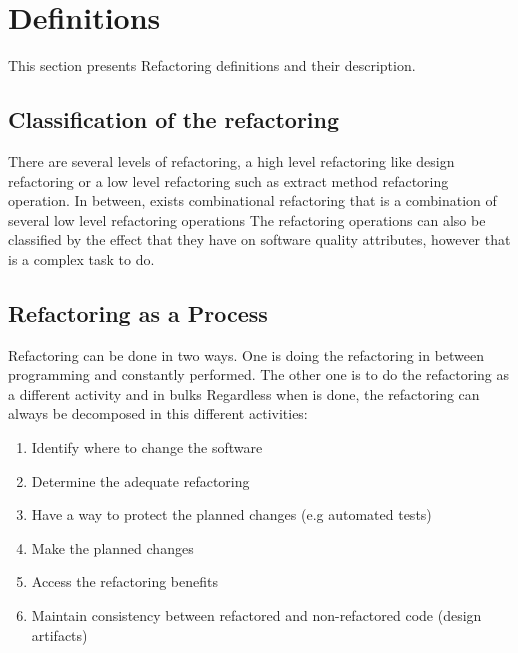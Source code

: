 \section{Definitions}


This section presents Refactoring definitions and their description.

\subsection{Classification of the refactoring}
There are several levels of refactoring, a high level refactoring like design refactoring or a low level refactoring such as extract method refactoring operation. 
In between, exists combinational refactoring that is a combination of several low level refactoring operations
The refactoring operations can also be classified by the effect that they have on software quality attributes, however that is a complex task to do. \cite{elish2011classification}

\subsection{Refactoring as a Process}
Refactoring can be done in two ways. %
One is doing the refactoring in between programming and constantly performed. 
The other one is to do the refactoring as a different activity and in bulks
Regardless when is done, the refactoring can always be decomposed in this different activities:

\begin{enumerate}
 \item Identify where to change the software
 \item Determine the adequate refactoring
 \item Have a way to protect the planned changes (e.g automated tests)
 \item Make the planned changes
 \item Access the refactoring benefits
 \item Maintain consistency between refactored and non-refactored code (design artifacts)
\end{enumerate}




